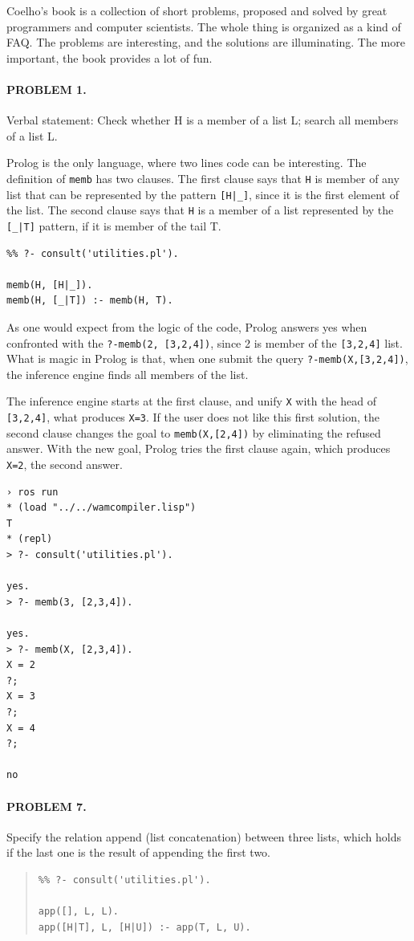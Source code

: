\documentclass[a4paper,12pt]{book}
\begin{document}
Coelho's book is a collection of short problems,
proposed and solved by great programmers and computer
scientists. The whole thing is organized as a kind of
FAQ. The problems are interesting, and the solutions
are illuminating. The more important, the book provides
a lot of fun. 

\pagebreak
\paragraph{PROBLEM 1.} Verbal statement: Check whether H
is a member of a list L; search all members of a list L.

Prolog is the only language, where two lines code can be
interesting. The definition of \verb|memb| has two clauses.
The first clause says that \verb|H| is member of any list that
can be represented by the pattern \verb/[H|_]/, since it
is the first element of the list. The second clause says that
\verb|H| is a member of a list represented by the \verb/[_|T]/
pattern, if it is member of the tail T.
\begin{verbatim}
%% ?- consult('utilities.pl').

memb(H, [H|_]).
memb(H, [_|T]) :- memb(H, T).
\end{verbatim}

As one would expect from the logic of the code,
Prolog answers yes when confronted with the
\verb|?-memb(2, [3,2,4])|, since 2 is member
of the \verb/[3,2,4]/ list. What is magic in
Prolog is that, when one submit the query
\verb|?-memb(X,[3,2,4])|, the inference engine
finds all members of the list.

The inference engine starts at the first clause,
and unify \verb|X| with the head of \verb|[3,2,4]|,
what produces \verb|X=3|. If the user does not like
this first solution, the second clause changes the
goal to \verb|memb(X,[2,4])| by eliminating the
refused answer. With the new goal, Prolog tries the
first clause again, which produces \verb|X=2|, the
second answer.
\begin{verbatim}
› ros run
* (load "../../wamcompiler.lisp")
T
* (repl)
> ?- consult('utilities.pl').

yes.
> ?- memb(3, [2,3,4]).

yes.
> ?- memb(X, [2,3,4]).
X = 2
?;
X = 3
?;
X = 4
?;

no
\end{verbatim}

\paragraph{PROBLEM 7.} Specify the relation append (list
concatenation) between three lists, which holds if the
last one is the result of appending the first two.
\begin{quote}
\begin{verbatim}
%% ?- consult('utilities.pl').

app([], L, L).
app([H|T], L, [H|U]) :- app(T, L, U).
\end{verbatim}
\end{quote}
\end{document}
